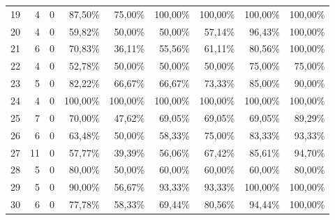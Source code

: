 \begin{table}[htbp]
{\begin{tabular}{r r r r r r r r r}
19 & 4 & 0 & 87,50\% & 75,00\% & 100,00\% & 100,00\% & 100,00\% & 100,00\% \\
20 & 4 & 0 & 59,82\% & 50,00\% & 50,00\% & 57,14\% & 96,43\% & 100,00\% \\
21 & 6 & 0 & 70,83\% & 36,11\% & 55,56\% & 61,11\% & 80,56\% & 100,00\% \\
22 & 4 & 0 & 52,78\% & 50,00\% & 50,00\% & 50,00\% & 75,00\% & 75,00\% \\
23 & 5 & 0 & 82,22\% & 66,67\% & 66,67\% & 73,33\% & 85,00\% & 90,00\% \\
24 & 4 & 0 & 100,00\% & 100,00\% & 100,00\% & 100,00\% & 100,00\% & 100,00\% \\
25 & 7 & 0 & 70,00\% & 47,62\% & 69,05\% & 69,05\% & 69,05\% & 89,29\% \\
26 & 6 & 0 & 63,48\% & 50,00\% & 58,33\% & 75,00\% & 83,33\% & 93,33\% \\
27 & 11 & 0 & 57,77\% & 39,39\% & 56,06\% & 67,42\% & 85,61\% & 94,70\% \\
28 & 5 & 0 & 80,00\% & 50,00\% & 60,00\% & 60,00\% & 60,00\% & 80,00\% \\
29 & 5 & 0 & 90,00\% & 56,67\% & 93,33\% & 93,33\% & 100,00\% & 100,00\% \\
30 & 6 & 0 & 77,78\% & 58,33\% & 69,44\% & 80,56\% & 94,44\% & 100,00\% \\
\bottomrule
\end{tabular}
}
\end{table}

